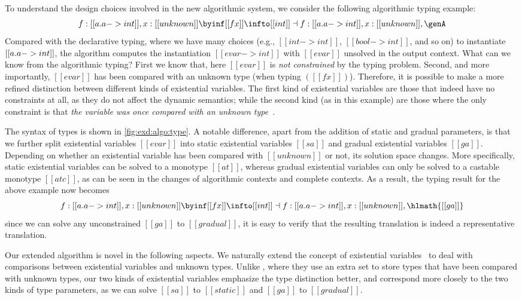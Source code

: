 To understand the design choices involved in the new algorithmic system, we
consider the following algorithmic typing example:
\[
  f: [[ \/a .  a -> int  ]], x : [[unknown]] \byinf [[ f x ]] \infto [[int]]  \dashv f : [[\/a . a -> int]], x : [[unknown]], \genA
\]
Compared with the declarative typing, where we have many choices (e.g., $[[int -> int]]$, $[[bool -> int]]$, and so on)
to instantiate $[[\/ a. a -> int]]$, the algorithm computes
the instantiation $[[ evar -> int ]]$ with $[[evar]]$ unsolved in the output context.
What can we know from the algorithmic typing? First we know that, here $[[evar]]$
is \textit{not constrained} by the typing problem. Second, and more importantly,
$[[evar]]$ has been compared with an unknown type (when typing $([[ f x ]])$).
Therefore, it is possible to make a more refined distinction
between different kinds of existential variables. The first
kind of existential variables are those that indeed have no constraints at all,
as they do not affect the dynamic semantics; while the second kind (as in this example) are
those where the only constraint is that
\textit{the variable was once compared with an unknown type}~\citep{garcia2015principal}.

The syntax of types is shown in \cref{fig:exd:algo:type}. A notable
difference, apart from the addition of static and gradual parameters, is that we
further split existential variables $[[evar]]$ into static existential variables
$[[ sa ]]$ and gradual existential variables $[[ga]]$.
Depending on whether an existential variable has been
compared with $[[unknown]]$ or not, its solution space changes. More
specifically, static existential variables can be solved to a monotype
$[[at]]$, whereas gradual existential variables can only be solved to a
castable monotype $[[atc]]$, as can be seen in the changes of algorithmic
contexts and complete contexts. As a result, the typing result for the above example
now becomes
\[
  f: [[ \/a .  a -> int  ]], x : [[unknown]] \byinf [[ f x ]] \infto [[int]]  \dashv f : [[\/a . a -> int]], x : [[unknown]], \hlmath{[[ga]]}
\]
since we can solve any unconstrained $[[ga]]$ to $[[gradual]]$, it is easy to
verify that the resulting translation is indeed a representative translation.

Our extended algorithm is novel in the following aspects. We naturally extend
the concept of existential variables~\citep{dunfield2013complete} to deal with
comparisons between existential variables and unknown types. Unlike
\citet{garcia2015principal}, where they use an extra set to store types that
have been compared with unknown types, our two kinds of existential variables emphasize
the type distinction better, and correspond more closely to the two kinds of type parameters,
as we can solve $[[sa]]$ to $ [[static]]$ and $[[ga]] $ to $ [[gradual]]$.

